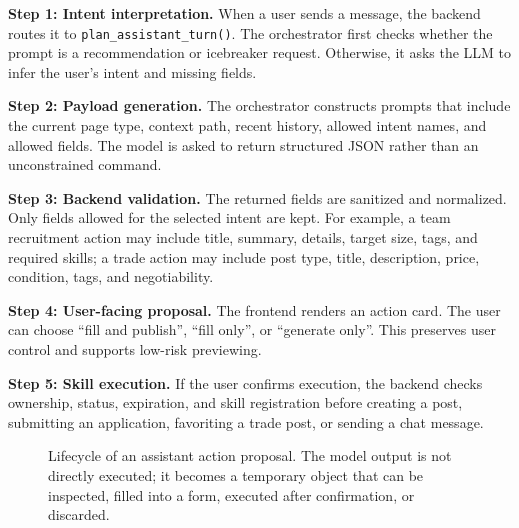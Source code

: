 \documentclass[sigconf]{acmart}
\begin{document}
\textbf{Step 1: Intent interpretation.} When a user sends a message, the backend routes it to \texttt{plan\_assistant\_turn()}. The orchestrator first checks whether the prompt is a recommendation or icebreaker request. Otherwise, it asks the LLM to infer the user's intent and missing fields.

\textbf{Step 2: Payload generation.} The orchestrator constructs prompts that include the current page type, context path, recent history, allowed intent names, and allowed fields. The model is asked to return structured JSON rather than an unconstrained command.

\textbf{Step 3: Backend validation.} The returned fields are sanitized and normalized. Only fields allowed for the selected intent are kept. For example, a team recruitment action may include title, summary, details, target size, tags, and required skills; a trade action may include post type, title, description, price, condition, tags, and negotiability.

\textbf{Step 4: User-facing proposal.} The frontend renders an action card. The user can choose ``fill and publish'', ``fill only'', or ``generate only''. This preserves user control and supports low-risk previewing.

\textbf{Step 5: Skill execution.} If the user confirms execution, the backend checks ownership, status, expiration, and skill registration before creating a post, submitting an application, favoriting a trade post, or sending a chat message.

\begin{figure}[t]
\centering
{}
\caption{Lifecycle of an assistant action proposal. The model output is not directly executed; it becomes a temporary object that can be inspected, filled into a form, executed after confirmation, or discarded.}
\label{fig:lifecycle}
\end{figure}
\end{document}
